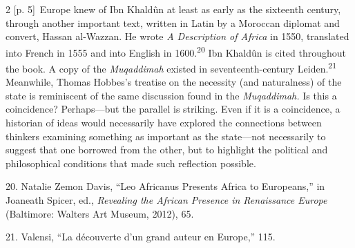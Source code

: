 \documentclass[10pt,a4paper]{article}
\begin{document}
\begin{paracol}{2}
\switchcolumn
{\scriptsize\color{gray} [p. 5]}\ Europe knew of Ibn Khaldûn at least as early as the sixteenth century, through another important text, written in Latin by a Moroccan diplomat and convert, Hassan al-Wazzan. He wrote \textit{A Description of Africa} in 1550, translated into French in 1555 and into English in 1600.\nobreak\textsuperscript{20} Ibn Khaldûn is cited throughout the book. A copy of the \textit{Muqaddimah} existed in seventeenth-century Leiden.\nobreak\textsuperscript{21} Meanwhile, Thomas Hobbes’s treatise on the necessity (and naturalness) of the state is reminiscent of the same discussion found in the \textit{Muqaddimah.} Is this a coincidence? Perhaps—but the parallel is striking. Even if it is a coincidence, a historian of ideas would necessarily have explored the connections between thinkers examining something as important as the state—not necessarily to suggest that one borrowed from the other, but to highlight the political and philosophical conditions that made such reflection possible.\par{\small 20. Natalie Zemon Davis, “Leo Africanus Presents Africa to Europeans,” in Joaneath Spicer, ed., \textit{Revealing the African Presence in Renaissance Europe} (Baltimore: Walters Art Museum, 2012), 65.\par}{\small 21. Valensi, “La découverte d’un grand auteur en Europe,” 115.\par}
\switchcolumn*

\end{paracol}
\end{document}
